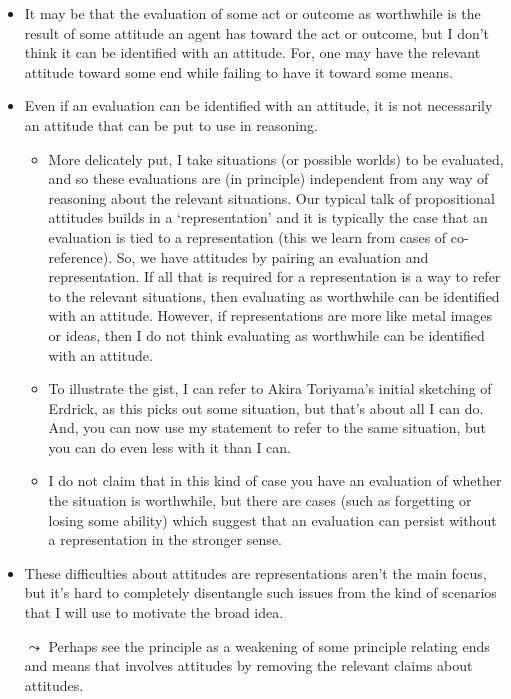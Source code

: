 \documentclass[10pt]{article}
\begin{document}
\begin{itemize}
\item It may be that the evaluation of some act or outcome as worthwhile is the result of some attitude an agent has toward the act or outcome, but I don't think it can be identified with an attitude.
  For, one may have the relevant attitude toward some end while failing to have it toward some means.
\item Even if an evaluation can be identified with an attitude, it is not necessarily an attitude that can be put to use in reasoning.
  \begin{itemize}
  \item More delicately put, I take situations (or possible worlds) to be evaluated, and so these evaluations are (in principle) independent from any way of reasoning about the relevant situations.
    Our typical talk of propositional attitudes builds in a `representation' and it is typically the case that an evaluation is tied to a representation (this we learn from cases of co-reference).
    So, we have attitudes by pairing an evaluation and representation.
    If all that is required for a representation is a way to refer to the relevant situations, then evaluating as worthwhile can be identified with an attitude.
    However, if representations are more like metal images or ideas, then I do not think evaluating as worthwhile can be identified with an attitude.
  \item To illustrate the gist, I can refer to Akira Toriyama's initial sketching of Erdrick, as this picks out some situation, but that's about all I can do.
    And, you can now use my statement to refer to the same situation, but you can do even less with it than I can.
  \item I do not claim that in this kind of case you have an evaluation of whether the situation is worthwhile, but there are cases (such as forgetting or losing some ability) which suggest that an evaluation can persist without a representation in the stronger sense.
  \end{itemize}
\item These difficulties about attitudes are representations aren't the main focus, but it's hard to completely disentangle such issues from the kind of scenarios that I will use to motivate the broad idea.
\item[\(\leadsto\)] Perhaps see the principle as a weakening of some principle relating ends and means that involves attitudes by removing the relevant claims about attitudes.
\end{itemize}
\end{document}

